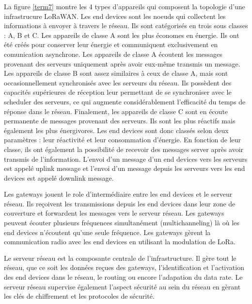 La figure \ref{term7} montre les 4 types d'appareils qui composent la topologie d'une infrastrucure LoRaWAN.
Les end devices sont les noeuds qui collectent les informations à envoyer à travers le réseau. Ils sont catégorisés en trois sous classes : A, B et C. Les appareils de classe A sont les plus économes en énergie. Ils ont été créés pour conserver leur énergie et communiquent exclusivement en comunication asynchrone. Les appareils de classe A écoutent les messages provenant des serveurs uniquement après avoir eux-même transmis un message. Les appareils de classe B sont assez similaires à ceux de classe A, mais sont occasionnellement synchronisés avec les serveurs du réseau. Ils possèdent des capacités supérieures de réception leur permettant de se synchroniser avec le scheduler des serveurs, ce qui augmente considérablement l'efficacité du temps de réponse dans le réseau. Finalement, les appareils de classe C sont en écoute permanente de messages provenant des serveurs. Ils sont les plus réactifs mais également les plus énergivores. Les end devices sont donc classés selon deux paramètres : leur réactivité et leur consommation d'énergie. En fonction de leur classe, ils ont également la possibilité de recevoir des messages server après avoir transmis de l'information. L'envoi d'un message d'un end devices vers les serveurs est appelé uplink message et l'envoi d'un message depuis les serveurs vers les end devices est appelé downlink message.

\vspace{0.1cm}

Les gateways jouent le role d'intermédiaire entre les end devices et le serveur réseau. Ils reçoivent les transmissions depuis les end devices dans leur zone de couverture
et forwardent les messages vers le serveur réseau. Les gateways peuvent écouter plusieurs fréquences simultanément (multichanneling) là où les end devices n'écoutent qu'une seule fréquence. Les gateways gèrent la communication radio avec les end devices en utilisant la modulation de \ac{LoRa}.

\vspace{0.1cm}

Le serveur réseau est la composante centrale de l'infrastructure. Il gère tout le réseau, que ce soit les données reçues des gateways, l'identification et l'activation des end devices dans le réseau, le routing ou encore l'adapation du data rate. Le serveur réseau supervise également l'aspect sécurité au sein du réseau en gèrant les clés de chiffrement et les protocoles de sécurité.


